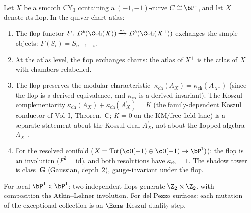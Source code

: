 \begin{proposition}[Flop \texorpdfstring{$=$}{=} \texorpdfstring{$\Eone$}{E1} Koszul duality]
\label{prop:flop-koszul-duality}
Let $X$ be a smooth CY$_3$ containing a $(-1,-1)$-curve $C \cong \bP^1$, and let $X^+$ denote its flop. In the quiver-chart atlas:
\begin{enumerate}[label=\textup{(\roman*)}]
 \item The flop functor $F \colon D^b(\Coh(X)) \xrightarrow{\sim} D^b(\Coh(X^+))$ exchanges the simple objects: $F(S_i) = S_{n+1-i}$.
 \item At the atlas level, the flop exchanges charts: the atlas of $X^+$ is the atlas of $X$ with chambers relabelled.
 \item The flop preserves the modular characteristic: $\kappa_{\mathrm{ch}}(A_X) = \kappa_{\mathrm{ch}}(A_{X^+})$ (since the flop is a derived equivalence, and $\kappa_{\mathrm{ch}}$ is a derived invariant). The Koszul complementarity $\kappa_{\mathrm{ch}}(A_X) + \kappa_{\mathrm{ch}}(A_X^!) = K$ (the family-dependent Koszul conductor of Vol~I, Theorem~C; $K = 0$ on the KM/free-field lane) is a separate statement about the Koszul dual $A_X^!$, not about the flopped algebra $A_{X^+}$.
 \item For the resolved conifold ($X = \mathrm{Tot}(\cO(-1) \oplus \cO(-1) \to \bP^1)$): the flop is an involution ($F^2 = \mathrm{id}$), and both resolutions have $\kappa_{\mathrm{ch}} = 1$. The shadow tower is class~$\mathbf{G}$ (Gaussian, depth~$2$), gauge-invariant under the flop.
\end{enumerate}
For local $\bP^1 \times \bP^1$: two independent flops generate $\Z_2 \times \Z_2$, with composition the Atkin--Lehner involution. For del Pezzo surfaces: each mutation of the exceptional collection is an $\Eone$ Koszul duality step.
\end{proposition}

